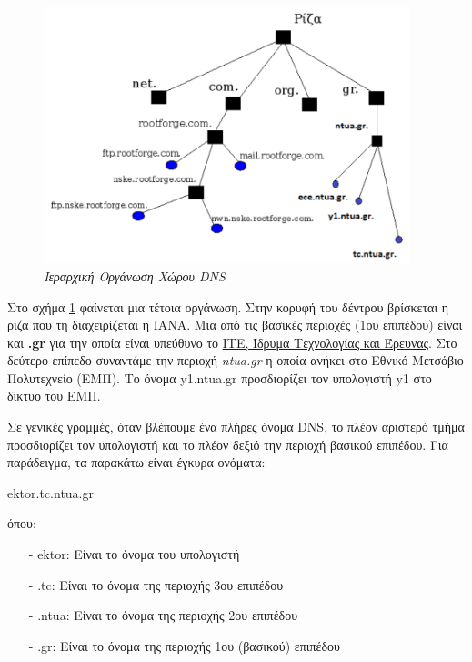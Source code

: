 \begin{figure}[!ht]
  \centering
  \includegraphics[width=0.95\textwidth]{images/chapter6/6-2}
  \caption {\textsl{Ιεραρχική Οργάνωση Χώρου DNS}}
  \label{6-2}
\end{figure}

Στο σχήμα \ref{6-2} φαίνεται μια τέτοια οργάνωση. Στην κορυφή του δέντρου βρίσκεται η ρίζα που τη διαχειρίζεται η ΙΑΝΑ. Μια από τις βασικές περιοχές (1ου επιπέδου) είναι και \textbf{.gr} για την οποία είναι υπεύθυνο το \href{https://grweb.ics.forth.gr/public/}{ΙΤΕ, Ίδρυμα Τεχνολογίας και Έρευνας}. Στο δεύτερο επίπεδο συναντάμε την περιοχή \emph{ntua.gr} η οποία ανήκει στο Εθνικό Μετσόβιο Πολυτεχνείο (ΕΜΠ). Το όνομα y1.ntua.gr προσδιορίζει τον υπολογιστή y1 στο δίκτυο του ΕΜΠ.

Σε γενικές γραμμές, όταν βλέπουμε ένα πλήρες όνομα DNS, το πλέον αριστερό τμήμα προσδιορίζει τον υπολογιστή και το πλέον δεξιό την περιοχή βασικού επιπέδου. Για παράδειγμα, τα παρακάτω είναι έγκυρα ονόματα:

\begin{center}
ektor.tc.ntua.gr
\end{center}

όπου:

\begin{itemize}
\item[-]ektor: Είναι το όνομα του υπολογιστή
\item[-].tc: Είναι το όνομα της περιοχής 3ου επιπέδου
\item[-].ntua: Είναι το όνομα της περιοχής 2ου επιπέδου
\item[-].gr: Είναι το όνομα της περιοχής 1ου (βασικού) επιπέδου
\end{itemize}

